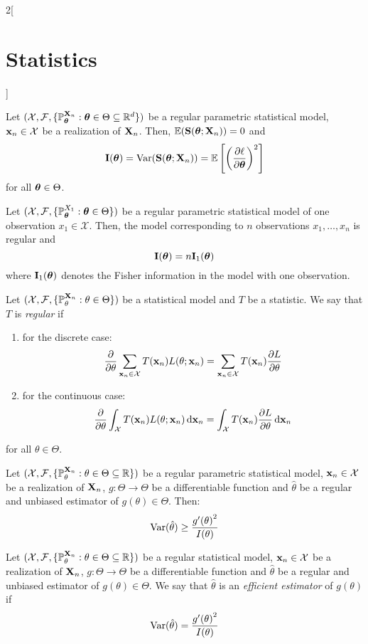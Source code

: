 \documentclass[../../../main.tex]{subfiles}
\begin{document}
\begin{multicols}{2}[\section{Statistics}]
  \begin{proposition}
    Let $(\mathcal{X},\mathcal{F},\{\mathbb{P}_{\boldsymbol{\mathrm{\theta}}}^{\boldsymbol{\mathrm{X}}_n}:\boldsymbol{\mathrm{\theta}}\in\Theta\subseteq\mathbb{R}^d\})$ be a regular parametric statistical model, $\boldsymbol{\mathrm{x}}_n\in\mathcal{X}$ be a realization of $\boldsymbol{\mathrm{X}}_n$. Then, $\mathbb{E}(\boldsymbol{\mathrm{S}}(\boldsymbol{\mathrm{\theta}};\boldsymbol{\mathrm{X}}_n))=0$ and $$\boldsymbol{\mathrm{I}}(\boldsymbol{\mathrm{\theta}})=\operatorname{Var}(\boldsymbol{\mathrm{S}}(\boldsymbol{\mathrm{\theta}};\boldsymbol{\mathrm{X}}_n))=\mathbb{E}\left[{\left(\pdv{\ell}{\boldsymbol{\mathrm{\theta}}}(\boldsymbol{\mathrm{\theta}};\boldsymbol{\mathrm{X}}_n)\right)}^2\right]$$
    for all $\boldsymbol{\mathrm{\theta}}\in\Theta$.
  \end{proposition}
  \begin{proposition}
    Let $(\mathcal{X},\mathcal{F},\{\mathbb{P}_{\boldsymbol{\mathrm{\theta}}}^{X_1}:\boldsymbol{\mathrm{\theta}}\in\Theta\})$ be a regular parametric statistical model of one observation $x_1\in \mathcal{X}$. Then, the model corresponding to $n$ \iid observations $x_1,\ldots,x_n$ is regular and $$\boldsymbol{\mathrm{I}}(\boldsymbol{\mathrm{\theta}})=n \boldsymbol{\mathrm{I}}_1(\boldsymbol{\mathrm{\theta}})$$
    where $\boldsymbol{\mathrm{I}}_1(\boldsymbol{\mathrm{\theta}})$ denotes the Fisher information in the model with one observation.
  \end{proposition}
  \begin{definition}
    Let $(\mathcal{X},\mathcal{F},\{\mathbb{P}_{\theta}^{\boldsymbol{\mathrm{X}}_n}:\theta\in\Theta\})$ be a statistical model and $T$ be a statistic. We say that $T$ is \emph{regular} if
    \begin{enumerate}
      \item for the discrete case: $$\pdv{}{\theta}\sum_{\boldsymbol{\mathrm{x}}_n\in\mathcal{X}}T(\boldsymbol{\mathrm{x}}_n)L(\theta;\boldsymbol{\mathrm{x}}_n)=\sum_{\boldsymbol{\mathrm{x}}_n\in\mathcal{X}}T(\boldsymbol{\mathrm{x}}_n)\pdv{L}{\theta}(\theta;\boldsymbol{\mathrm{x}}_n)$$
      \item for the continuous case: $$\pdv{}{\theta}\int_{\mathcal{X}}T(\boldsymbol{\mathrm{x}}_n)L(\theta;\boldsymbol{\mathrm{x}}_n)\dd{\boldsymbol{\mathrm{x}}_n}=\int_{\mathcal{X}}T(\boldsymbol{\mathrm{x}}_n)\pdv{L}{\theta}(\theta;\boldsymbol{\mathrm{x}}_n)\dd{\boldsymbol{\mathrm{x}}_n}$$
    \end{enumerate}
    for all $\theta\in\Theta$.
  \end{definition}
  \begin{theorem}
    Let $(\mathcal{X}, \mathcal{F}, \{\mathbb{P}_{\theta}^{\boldsymbol{\mathrm{X}}_n}: \theta\in\Theta\subseteq\mathbb{R}\})$ be a regular parametric statistical model, $\boldsymbol{\mathrm{x}}_n\in\mathcal{X}$ be a realization of $\boldsymbol{\mathrm{X}}_n$, $g:\Theta\rightarrow\Theta$ be a differentiable function and ${\hat\theta}$ be a regular and unbiased estimator of $g({\theta})\in\Theta$. Then: $$\operatorname{Var}(\hat\theta)\geq \frac{{g'(\theta)}^2}{I(\theta)}$$
  \end{theorem}
  \begin{definition}
    Let $(\mathcal{X},\mathcal{F},\{\mathbb{P}_{\theta}^{\boldsymbol{\mathrm{X}}_n}:\theta\in\Theta\subseteq\mathbb{R}\})$ be a regular statistical model, $\boldsymbol{\mathrm{x}}_n\in\mathcal{X}$ be a realization of $\boldsymbol{\mathrm{X}}_n$, $g:\Theta\rightarrow\Theta$ be a differentiable function and ${\hat\theta}$ be a regular and unbiased estimator of $g({\theta})\in\Theta$. We say that $\hat\theta$ is an \emph{efficient estimator} of $g(\theta)$ if $$\operatorname{Var}(\hat\theta)=\frac{{g'(\theta)}^2}{I(\theta)}$$

\end{definition}
\end{multicols}
\end{document}
